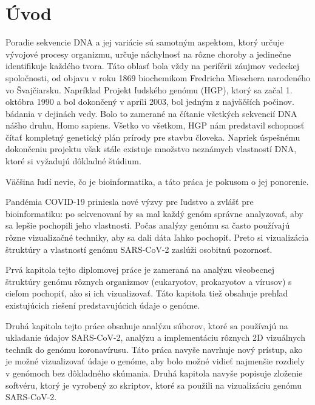 
{}

\chapter*{Úvod}

\par Poradie sekvencie DNA a jej variácie sú samotným aspektom, ktorý určuje vývojové procesy organizmu,
určuje náchylnosť na rôzne choroby a jedinečne identifikuje každého tvora. Táto oblasť bola vždy na periférii
záujmov vedeckej spoločnosti, od objavu v roku 1869 biochemikom Fredricha Mieschera narodeného vo Švajčiarsku.
Napríklad Projekt ľudského genómu (HGP), ktorý sa začal 1. októbra 1990 a bol dokončený v apríli 2003, bol jedným z najväčších počinov.
bádania v dejinách vedy. Bolo to zamerané na čítanie všetkých sekvencií DNA nášho druhu, Homo sapiens. Všetko vo všetkom,
HGP nám predstavil schopnosť čítať kompletný genetický plán prírody pre stavbu človeka.
Napriek úspešnému dokončeniu projektu však stále existuje množstvo neznámych vlastností DNA, ktoré si vyžadujú dôkladné štúdium.

Väčšina ľudí nevie, čo je bioinformatika, a táto práca je pokusom o jej ponorenie.

Pandémia COVID-19 priniesla nové výzvy pre ľudstvo a zvlášť pre bioinformatiku: po sekvenovaní by sa mal každý genóm správne analyzovať, aby sa lepšie pochopili jeho vlastnosti.
Počas analýzy genómu sa často používajú rôzne vizualizačné techniky, aby sa dali dáta ľahko pochopiť.
Preto si vizualizácia štruktúry a vlastností genómu SARS-CoV-2 zaslúži osobitnú pozornosť.

Prvá kapitola tejto diplomovej práce je zameraná na analýzu všeobecnej štruktúry genómu rôznych organizmov (eukaryotov, prokaryotov a vírusov) s cieľom pochopiť, ako si ich vizualizovať.
Táto kapitola tiež obsahuje prehľad existujúcich riešení predstavujúcich údaje o genóme.

Druhá kapitola tejto práce obsahuje analýzu súborov, ktoré sa používajú na ukladanie údajov SARS-CoV-2, analýzu a implementáciu rôznych 2D vizuálnych techník do genómu koronavírusu.
Táto práca navyše navrhuje nový prístup, ako je možné vizualizovať údaje o genóme, aby bolo možné vidieť najmenšie rozdiely v genómoch bez dôkladného skúmania.
Druhá kapitola navyše popisuje zloženie softvéru, ktorý je vyrobený zo skriptov, ktoré sa použili na vizualizáciu genómu SARS-CoV-2.


